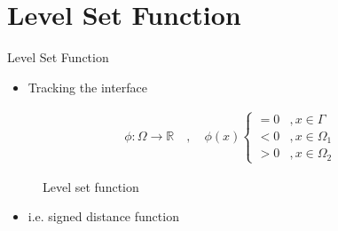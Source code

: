 \documentclass[10pt]{beamer}	%
\begin{document}
\section{Level Set Function}
\begin{frame}{Level Set Function}
	\begin{itemize}
        \item Tracking the interface
	\end{itemize}
	\begin{align*}
        \phi : \Omega \to \mathbb{R} \quad , \quad
        \phi(x) \begin{cases}
        = 0 & , x \in \Gamma\\
        < 0 &, x \in  \Omega_1\\
        > 0 &, x \in  \Omega_2
        \end{cases}
	\end{align*}
	
    \begin{figure}
        \caption{Level set function}
        \label{fig:level_set}
    \end{figure}
    
    \begin{itemize}
        \item i.e. signed distance function
    \end{itemize}
	
\end{frame}
\end{document}

